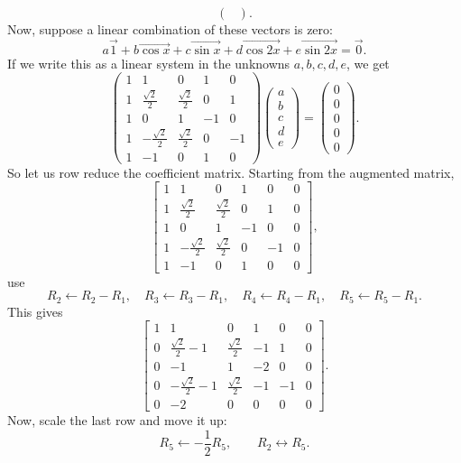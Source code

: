\documentclass[10pt]{extarticle}
\begin{document}
\begin{enumerate}[label=(\alph*)]
\[\begin{pmatrix}
\end{pmatrix}.
\]
Now, suppose a linear combination of these vectors is zero:
\[
a\vec{1}+b\vec{\cos x}+c\vec{\sin x}+d\vec{\cos 2x}+e\vec{\sin 2x}=\vec{0}.
\]
If we write this as a linear system in the unknowns $a,b,c,d,e$, we get
\[
\begin{pmatrix}
1 & 1 & 0 & 1 & 0\\
1 & \frac{\sqrt{2}}{2} & \frac{\sqrt{2}}{2} & 0 & 1\\[0.4em]
1 & 0 & 1 & -1 & 0\\
1 & -\frac{\sqrt{2}}{2} & \frac{\sqrt{2}}{2} & 0 & -1\\[0.4em]
1 & -1 & 0 & 1 & 0
\end{pmatrix}
\begin{pmatrix}
a\\b\\c\\d\\e
\end{pmatrix}
=
\begin{pmatrix}
0\\0\\0\\0\\0
\end{pmatrix}.
\]
So let us row reduce the coefficient matrix. Starting from the augmented matrix,
\[
\left[
\begin{array}{ccccc|c}
1 & 1 & 0 & 1 & 0 & 0\\
1 & \frac{\sqrt{2}}{2} & \frac{\sqrt{2}}{2} & 0 & 1 & 0\\[0.4em]
1 & 0 & 1 & -1 & 0 & 0\\
1 & -\frac{\sqrt{2}}{2} & \frac{\sqrt{2}}{2} & 0 & -1 & 0\\[0.4em]
1 & -1 & 0 & 1 & 0 & 0
\end{array}
\right],
\]
use
\[
R_2\leftarrow R_2-R_1,\quad
R_3\leftarrow R_3-R_1,\quad
R_4\leftarrow R_4-R_1,\quad
R_5\leftarrow R_5-R_1.
\]
This gives
\[
\left[
\begin{array}{ccccc|c}
1 & 1 & 0 & 1 & 0 & 0\\
0 & \frac{\sqrt{2}}{2}-1 & \frac{\sqrt{2}}{2} & -1 & 1 & 0\\[0.4em]
0 & -1 & 1 & -2 & 0 & 0\\
0 & -\frac{\sqrt{2}}{2}-1 & \frac{\sqrt{2}}{2} & -1 & -1 & 0\\[0.4em]
0 & -2 & 0 & 0 & 0 & 0
\end{array}
\right].
\]
Now, scale the last row and move it up:
\[
R_5\leftarrow -\frac{1}{2}R_5,\qquad R_2\leftrightarrow R_5.
\]
\end{enumerate}
\end{document}
